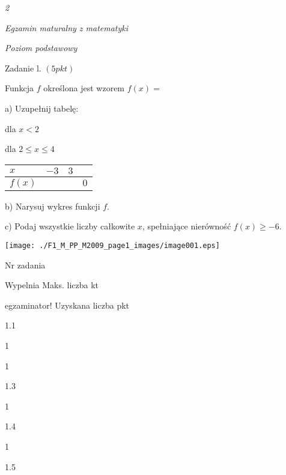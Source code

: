 \documentclass[a4paper,12pt]{article}
\begin{document}
{\it 2}

{\it Egzamin maturalny z matematyki}

{\it Poziom podstawowy}

Zadanie l. $(5pkt)$

Funkcja $f$ określona jest wzorem $f(x)=$

a) Uzupełnij tabelę:

dla $x<2$

dla $2\leq x\leq 4$
\begin{center}
\begin{tabular}{|l|l|l|l|}
\hline
\multicolumn{1}{|l|}{$x$}&	\multicolumn{1}{|l|}{ $-3$}&	\multicolumn{1}{|l|}{ $3$}&	\multicolumn{1}{|l|}{}	\\
\hline
\multicolumn{1}{|l|}{ $f(x)$}&	\multicolumn{1}{|l|}{}&	\multicolumn{1}{|l|}{}&	\multicolumn{1}{|l|}{ $0$}	\\
\hline
\end{tabular}

\end{center}
b) Narysuj wykres funkcji $f.$

c) Podaj wszystkie liczby całkowite $x$, spełniające nierówność $f(x)\geq-6.$
\begin{center}
\texttt{[image: ./F1\_M\_PP\_M2009\_page1\_images/image001.eps]}
\end{center}
Nr zadania

Wypelnia Maks. liczba kt

egzaminator! Uzyskana liczba pkt

1.1

1

1

1.3

1

1.4

1

1.5
\end{document}
